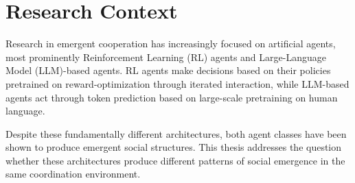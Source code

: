 \section{Research Context}





Research in emergent cooperation has increasingly focused on artificial agents, most prominently Reinforcement Learning (RL) agents and Large-Language Model (LLM)-based agents. RL agents make decisions based on their policies pretrained on reward-optimization through iterated interaction, while LLM-based agents act through token prediction based on large-scale pretraining on human language. 

Despite these fundamentally different architectures, both agent classes have been shown to produce emergent social structures. This thesis addresses the question whether these architectures produce different patterns of social emergence in the same coordination environment.
